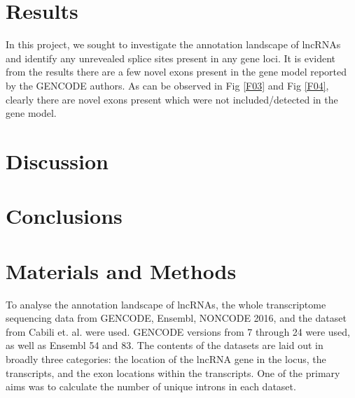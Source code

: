 \documentclass[ncrna,article,submit,moreauthors,pdftex,10pt,a4paper]{mdpi}
\begin{document}
\section{Results}

In this project, we sought to investigate the annotation landscape of lncRNAs and identify any unrevealed splice sites present
in any gene loci.
It is evident from the results there are a few novel exons present in the gene model reported by the GENCODE authors. As can be observed in
Fig \ref{F03} and Fig \ref{F04}, clearly there are novel exons present which were not included/detected in the gene model.
\begin{figure}[h]
\end{figure}

\begin{figure}[ht]
 \centering 
 \label{F07}
 \label{F08}
\end{figure}

%
\section{Discussion}


\section{Conclusions}

\section{Materials and Methods}

To analyse the annotation landscape of lncRNAs, the whole transcriptome sequencing data from GENCODE, Ensembl, NONCODE 2016, 
and the dataset from Cabili et. al. were used. GENCODE versions from 7 through 24 were used, as well as Ensembl 54 and 83.
The contents of the datasets are laid out in broadly three categories: the location of the lncRNA gene in the locus, 
the transcripts, and the exon locations within the transcripts. One of the primary aims was to calculate
the number of unique introns in each dataset. 
\end{document}
